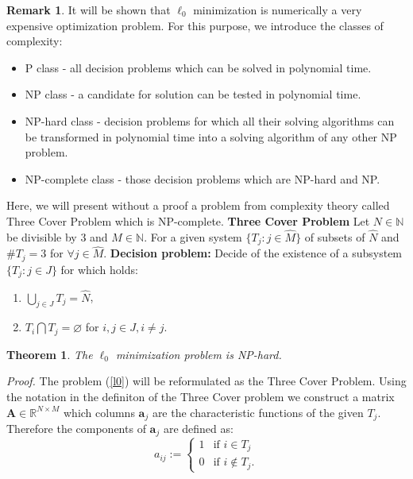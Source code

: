 \documentclass[11pt,oneside,czech,american]{book} %
\theoremstyle{plain}
\newtheorem{thm}{Theorem}
\theoremstyle{definition}
\newtheorem{rmrk}{Remark}
\begin{document}
\begin{rmrk}
	It will be shown that $\ell_{0}$ minimization is numerically a very expensive optimization problem. For this purpose, we introduce the classes of complexity:
	
	\begin{itemize}
		\item P class - all decision problems which can be solved in polynomial time.
		\item NP class - a candidate for solution can be tested in polynomial time.
		\item NP-hard class - decision problems for which all their solving algorithms can be transformed in polynomial time  into a solving algorithm of any other NP problem.
		\item NP-complete class - those decision problems which are NP-hard and NP.
	\end{itemize}
	Here, we will present without a proof a problem from complexity theory called Three Cover Problem which is NP-complete.
	\newline
	\textbf{Three Cover Problem}
	\newline
	Let $N \in \mathbb{N}$ be divisible by 3 and $M \in \mathbb{N}$. For a given system $\{T_j: j \in \hat{M}\}$ of subsets of $\hat{N}$ and $\#T_j = 3$ for $\forall j \in \hat{M}$. \textbf{Decision problem:} Decide of the existence of a subsystem $\{T_j: j \in J\}$ for which holds:
	\begin{enumerate}
		\item $\bigcup_{j \in J} T_j = \hat{N}$,
		\item $T_i \bigcap T_j = \varnothing$ for $i,j \in J, i\neq j$.
	\end{enumerate}
	
\end{rmrk}
\begin{thm}
	The $\ell_{0}$ minimization problem is NP-hard.
\end{thm}
\emph{Proof.} The problem (\ref{l0}) will be reformulated as the Three Cover Problem. Using the notation in the definiton of the Three Cover problem we construct a matrix $\bm{A} \in \mathbb{R}^{N \times M}$ which columns $\bm{a}_j$ are the characteristic functions of the given $T_j$. Therefore the components of $\bm{a}_j$ are defined as:
\begin{equation*}
	a_{ij} := \begin{cases}
		1 &\text{if $i \in T_j$}\\
		0 &\text{if $i \notin T_j$}.
	\end{cases}
\end{equation*}
\end{document}
